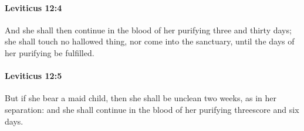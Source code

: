 		\paragraph{Leviticus 12:4} %
			\label{LEVITICUS-12-4}

			And she shall then continue in the blood of her purifying three and thirty days; she shall touch no hallowed thing, nor come into the sanctuary, until the days of her purifying be fulfilled.


		\paragraph{Leviticus 12:5} %
			\label{LEVITICUS-12-5}

			But if she bear a maid child, then she shall be unclean two weeks, as in her separation: and she shall continue in the blood of her purifying threescore and six days.



